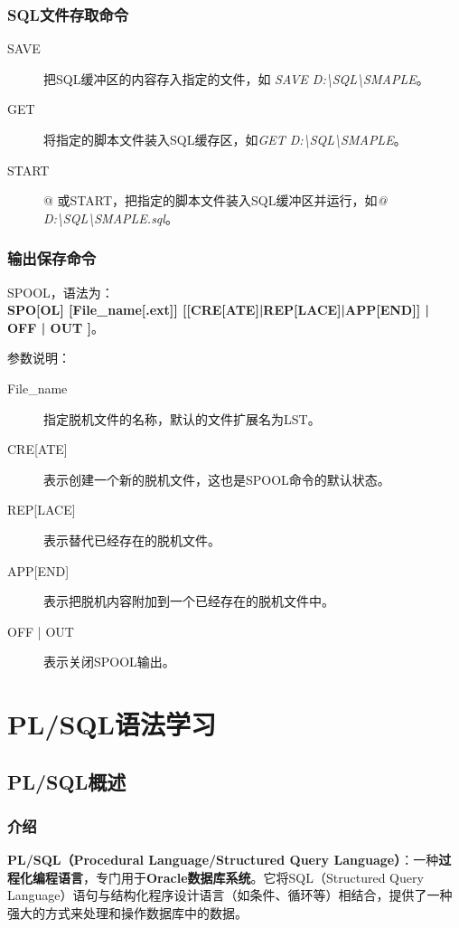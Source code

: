 \documentclass[11pt, a4paper, oneside, UTF8]{ctexbook}
\let\kaishu\relax %
\begin{document}
\subsection{SQL文件存取命令}

\begin{description}
  \item[SAVE] 把SQL缓冲区的内容存入指定的文件，如 \textit{SAVE D:\textbackslash SQL\textbackslash SMAPLE}。
  \item[GET] 将指定的脚本文件装入SQL缓存区，如\textit{GET D:\textbackslash SQL\textbackslash SMAPLE}。
  \item[START] @ 或START，把指定的脚本文件装入SQL缓冲区并运行，如\textit{@ D:\textbackslash SQL\textbackslash SMAPLE.sql}。
\end{description}

\subsection{输出保存命令}
SPOOL，语法为：\\
{\bfseries\kaishu SPO[OL] [File\_name[.ext]] [[CRE[ATE]|REP[LACE]|APP[END]] | OFF | OUT ]}。

参数说明：
\begin{description}
  \item[File\_name] 指定脱机文件的名称，默认的文件扩展名为LST。
  \item[\textup{CRE[ATE]}] 表示创建一个新的脱机文件，这也是SPOOL命令的默认状态。
  \item[\textup{REP[LACE]}] 表示替代已经存在的脱机文件。
  \item[\textup{APP[END]}] 表示把脱机内容附加到一个已经存在的脱机文件中。
  \item[OFF | OUT] 表示关闭SPOOL输出。
\end{description}

\chapter{PL/SQL语法学习}
\section{PL/SQL概述}
\subsection{介绍}
\textbf{PL/SQL（Procedural Language/Structured Query Language）}：一种\textbf{过程化编程语言}，专门用于\textbf{Oracle数据库系统}。它将SQL（Structured Query Language）语句与结构化程序设计语言（如条件、循环等）相结合，提供了一种强大的方式来处理和操作数据库中的数据。
\end{document}
